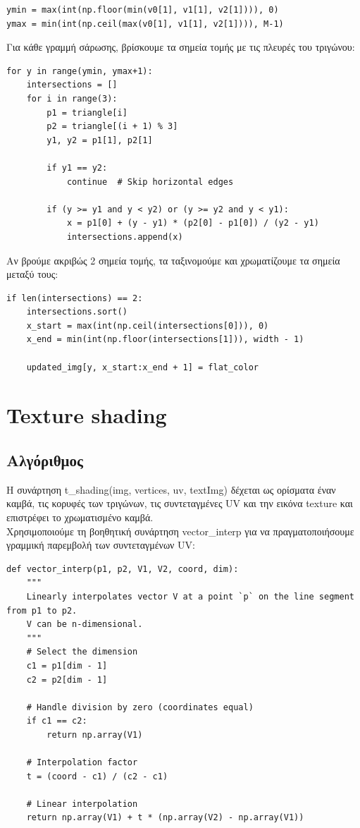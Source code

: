 \documentclass{article}
\begin{document}
\begin{lstlisting}
ymin = max(int(np.floor(min(v0[1], v1[1], v2[1]))), 0)
ymax = min(int(np.ceil(max(v0[1], v1[1], v2[1]))), M-1)
\end{lstlisting}

Για κάθε γραμμή σάρωσης, βρίσκουμε τα σημεία τομής με τις πλευρές του τριγώνου:

\begin{lstlisting}
for y in range(ymin, ymax+1):
    intersections = []
    for i in range(3):
        p1 = triangle[i]
        p2 = triangle[(i + 1) % 3]
        y1, y2 = p1[1], p2[1]

        if y1 == y2:
            continue  # Skip horizontal edges

        if (y >= y1 and y < y2) or (y >= y2 and y < y1):
            x = p1[0] + (y - y1) * (p2[0] - p1[0]) / (y2 - y1)
            intersections.append(x)
\end{lstlisting}

Αν βρούμε ακριβώς 2 σημεία τομής, τα ταξινομούμε και χρωματίζουμε τα σημεία μεταξύ τους:

\begin{lstlisting}
if len(intersections) == 2:
    intersections.sort()
    x_start = max(int(np.ceil(intersections[0])), 0)
    x_end = min(int(np.floor(intersections[1])), width - 1)

    updated_img[y, x_start:x_end + 1] = flat_color
\end{lstlisting}

\section{Texture shading}

\subsection{Αλγόριθμος}
Η συνάρτηση t\_shading(img, vertices, uv, textImg) δέχεται ως ορίσματα έναν καμβά, τις κορυφές των τριγώνων, τις συντεταγμένες UV και την εικόνα texture και επιστρέφει το χρωματισμένο καμβά.\\
Χρησιμοποιούμε τη βοηθητική συνάρτηση vector\_interp για να πραγματοποιήσουμε γραμμική παρεμβολή των συντεταγμένων UV:

\begin{lstlisting}
def vector_interp(p1, p2, V1, V2, coord, dim):
    """
    Linearly interpolates vector V at a point `p` on the line segment from p1 to p2.
    V can be n-dimensional.
    """
    # Select the dimension
    c1 = p1[dim - 1]
    c2 = p2[dim - 1]

    # Handle division by zero (coordinates equal)
    if c1 == c2:
        return np.array(V1)

    # Interpolation factor
    t = (coord - c1) / (c2 - c1)

    # Linear interpolation
    return np.array(V1) + t * (np.array(V2) - np.array(V1))
\end{lstlisting}
\end{document}
